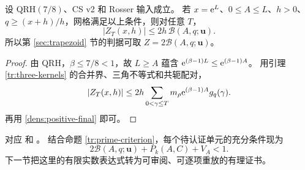 \begin{proposition}[完整零点预算]\label{dens:zero-budget}
设 QRH$(7/8)$、CS v2 和 Rosser 输入成立。
若 $x=\mathrm e^L$、$0\leq A\leq L$、$h>0$、
$q\geq(x+h)/h$，网格满足以上条件，则对任意 $T$，
\begin{equation}\label{dens:zero-budget-eq}
 |Z_T(x,h)|\leq2h\,\mathcal B(A,q;\boldsymbol u).
\end{equation}
所以第 \ref{sec:trapezoid} 节的判据可取
$Z=2\mathcal B(A,q;\boldsymbol u)$。
\end{proposition}
\begin{proof}
由 QRH，$\beta\leq7/8<1$，故 $L\geq A$ 蕴含
$\mathrm e^{(\beta-1)L}\leq\mathrm e^{(\beta-1)A}$。
用引理 \ref{tr:three-kernels} 的合并界、三角不等式和共轭配对，
\[
 |Z_T(x,h)|
 \leq2h\sum_{0<\gamma\leq T}
                  m_\rho\mathrm e^{(\beta-1)A}g_q(\gamma).
\]
再用 \eqref{dens:positive-final} 即可。
\end{proof}
对应 
和
。
结合命题 \ref{tr:prime-criterion}，每个待认证单元的充分条件现为
\[
 2\mathcal B(A,q;\boldsymbol u)+P_k(A,C)+V_A<1.
\]
下一节把这里的有限实数表达式转为可审阅、可逐项重放的有理证书。
